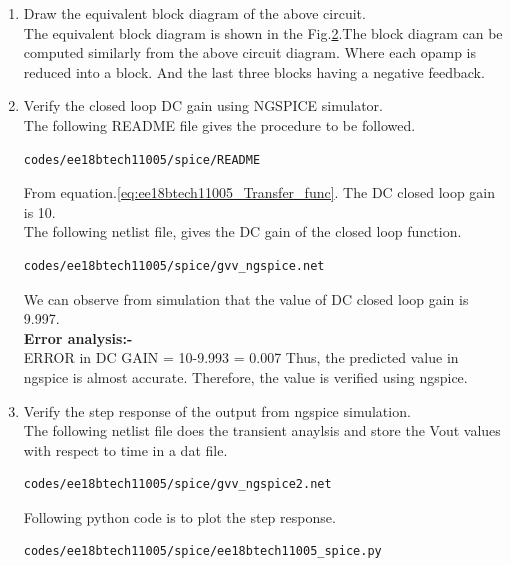 \begin{enumerate}[label=\arabic*.,ref=\theenumi]
\begin{figure}[!hbt]
\label{fig:Final_circuit}
\end{figure}
\item Draw the equivalent block diagram of the above circuit.\\
\solution The equivalent block diagram is shown in the Fig.\ref{fig:ee18btech11005_4}.The block diagram can be computed similarly from the above circuit diagram. Where each opamp is reduced into a block. And the last three blocks having a negative feedback.
\begin{figure}[!ht]
	\begin{center}
			\resizebox{\columnwidth}{!}{}
	\end{center}
\caption{}
\label{fig:ee18btech11005_4}
\end{figure}
\item Verify the closed loop DC gain using NGSPICE simulator.
\\
\solution 
The following README file gives the procedure to be followed.
\begin{lstlisting}
codes/ee18btech11005/spice/README
\end{lstlisting}
From equation.\ref{eq:ee18btech11005_Transfer_func}.
The DC closed loop gain is 10.\\
The following netlist file, gives the DC gain of the closed loop function.
\begin{lstlisting}
codes/ee18btech11005/spice/gvv_ngspice.net
\end{lstlisting}
We can observe from simulation that the value of DC closed loop gain is 9.997.\\
\textbf{Error analysis:-}\\
ERROR in DC GAIN = 10-9.993 = 0.007
Thus, the predicted value in ngspice is almost accurate.
Therefore, the value is verified using ngspice.
\item Verify the step response of the output from ngspice simulation.\\
\solution The following netlist file does the transient anaylsis and store the Vout values with respect to time in a dat file. 
\begin{lstlisting}
codes/ee18btech11005/spice/gvv_ngspice2.net
\end{lstlisting}
Following python code is to plot the step response.
\begin{lstlisting}
codes/ee18btech11005/spice/ee18btech11005_spice.py

\end{lstlisting}
\end{enumerate}
